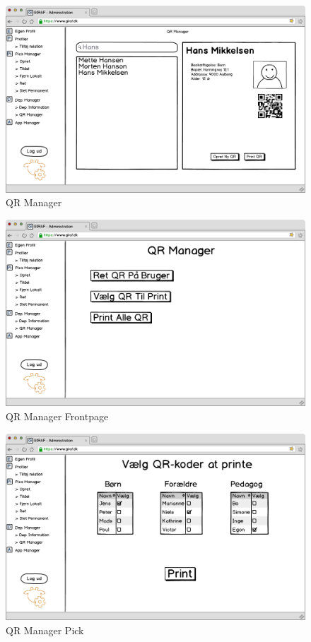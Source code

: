 \newpage

\begin{figure}[!h]
\centering
\includegraphics[width=1\textwidth]{images/mockup/QR_manager.png}
\caption{QR Manager}
\label{fig:qr_manager}
\end{figure}

\begin{figure}[!h]
\centering
\includegraphics[width=1\textwidth]{images/mockup/qrManagerFront.png}
\caption{QR Manager Frontpage}
\label{fig:qr_manager_front}
\end{figure}

\newpage

\begin{figure}[!h]
\centering
\includegraphics[width=1\textwidth]{images/mockup/qrManagerPick.png}
\caption{QR Manager Pick}
\label{fig:qr_manager_pick}
\end{figure}

